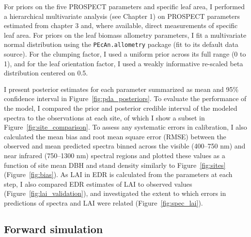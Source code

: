 For priors on the five PROSPECT parameters and specific leaf area, I performed a hierarchical multivariate analysis (see Chapter 1) on PROSPECT parameters estimated from chapter 3 and, where available, direct measurements of specific leaf area. 
For priors on the leaf biomass allometry parameters, I fit a multivariate normal distribution using the \texttt{PEcAn.allometry} package (fit to its default data source). %
% 
% 
For the clumping factor, I used a uniform prior across its full range (0 to 1), and for the leaf orientation factor, I used a weakly informative re-scaled beta distribution centered on 0.5.

I present posterior estimates for each parameter summarized as mean and 95\% confidence interval in Figure~\ref{fig:pda_posteriors}.
To evaluate the performance of the model, I compared the prior and posterior credible interval of the modeled spectra to the observations at each site, of which I show a subset in Figure~\ref{fig:site_comparison}.
% 
% 
To assess any systematic errors in calibration, I also calculated the mean bias and root mean square error (RMSE) between the observed and mean predicted spectra binned across the visible (400--750 nm) and near infrared (750--1300 nm) spectral regions and plotted these values as a function of site mean DBH and stand density similarly to Figure~\ref{fig:sites} (Figure~\ref{fig:bias}).
As LAI in EDR is calculated from the parameters at each step, I also compared EDR estimates of LAI to observed values (Figure~\ref{fig:lai_validation}), and investigated the extent to which errors in predictions of spectra and LAI were related (Figure~\ref{fig:spec_lai}).

\subsection{Forward simulation}

